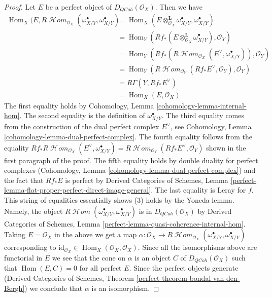 \documentclass[10pt,a4paper]{amsart}
\theoremstyle{plain}
\theoremstyle{definition}
\theoremstyle{remark}
\numberwithin{equation}{subsection}
\def\Hom{\mathop{\mathrm{Hom}}\nolimits}
\def\SheafHom{\mathop{\mathcal{H}\!\mathit{om}}\nolimits}
\def\QCoh{\mathit{QCoh}}
\begin{document}
\begin{proof}
\medskip\noindent
Let $E$ be a perfect object of $D_\QCoh(\mathcal{O}_X)$. Then
we have
\begin{align*}
\Hom_X(E, R\SheafHom_{\mathcal{O}_X}(\omega_{X/Y}^\bullet, \omega_{X/Y}^\bullet)
& =
\Hom_X(E \otimes_{\mathcal{O}_X}^\mathbf{L} \omega_{X/Y}^\bullet,
\omega_{X/Y}^\bullet) \\
& =
\Hom_Y(Rf_*(E \otimes_{\mathcal{O}_X}^\mathbf{L} \omega_{X/Y}^\bullet),
\mathcal{O}_Y) \\
& =
\Hom_Y(Rf_*(R\SheafHom_{\mathcal{O}_X}(E^\vee, \omega_{X/Y}^\bullet)),
\mathcal{O}_Y) \\
& =
\Hom_Y(R\SheafHom_{\mathcal{O}_Y}(Rf_*E^\vee, \mathcal{O}_Y),
\mathcal{O}_Y) \\
& =
R\Gamma(Y, Rf_*E^\vee) \\
& =
\Hom_X(E, \mathcal{O}_X)
\end{align*}
The first equality holds by Cohomology, Lemma
\ref{cohomology-lemma-internal-hom}.
The second equality is the definition of $\omega_{X/Y}^\bullet$.
The third equality comes from the construction of the dual perfect
complex $E^\vee$, see Cohomology, Lemma
\ref{cohomology-lemma-dual-perfect-complex}.
The fourth equality follows from the equality
$Rf_*R\SheafHom_{\mathcal{O}_X}(E^\vee, \omega_{X/Y}^\bullet) =
R\SheafHom_{\mathcal{O}_Y}(Rf_*E^\vee, \mathcal{O}_Y)$
shown in the first paragraph of the proof.
The fifth equality holds by double duality for perfect complexes
(Cohomology, Lemma
\ref{cohomology-lemma-dual-perfect-complex})
and the fact that $Rf_*E$ is perfect by
Derived Categories of Schemes, Lemma
\ref{perfect-lemma-flat-proper-perfect-direct-image-general}.
The last equality is Leray for $f$.
This string of equalities essentially shows (3)
holds by the Yoneda lemma. Namely, the object
$R\SheafHom(\omega_{X/Y}^\bullet, \omega_{X/Y}^\bullet)$
is in $D_\QCoh(\mathcal{O}_X)$ by Derived Categories of Schemes, Lemma
\ref{perfect-lemma-quasi-coherence-internal-hom}.
Taking $E = \mathcal{O}_X$ in the above we get a map
$\alpha : \mathcal{O}_X \to
R\SheafHom_{\mathcal{O}_X}(\omega_{X/Y}^\bullet, \omega_{X/Y}^\bullet)$
corresponding to
$\text{id}_{\mathcal{O}_X} \in \Hom_X(\mathcal{O}_X, \mathcal{O}_X)$.
Since all the isomorphisms above are functorial in $E$ we
see that the cone on $\alpha$ is an object $C$ of $D_\QCoh(\mathcal{O}_X)$
such that $\Hom(E, C) = 0$ for all perfect $E$.
Since the perfect objects generate
(Derived Categories of Schemes, Theorem
\ref{perfect-theorem-bondal-van-den-Bergh})
we conclude that $\alpha$ is an isomorphism.
\end{proof}
\end{document}
